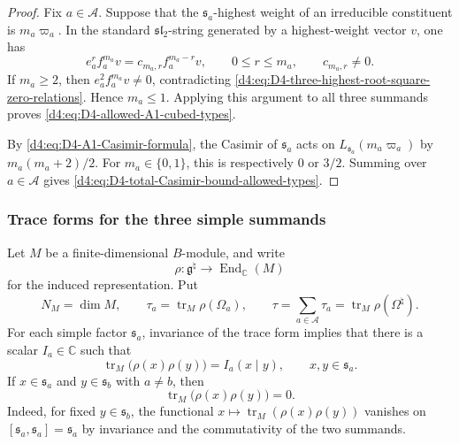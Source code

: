 \documentclass[11pt,reqno]{amsart}
\theoremstyle{definition}
\theoremstyle{remark}
\begin{document}
\begin{proof}
Fix \(a\in\mathcal A\).  Suppose that the \(\mathfrak s_a\)-highest
weight of an irreducible constituent is \(m_a\varpi_a\).  In the
standard \(\mathfrak{sl}_2\)-string generated by a highest-weight vector
\(v\), one has
\begin{equation*}
  e_a^r f_a^{m_a}v
  =c_{m_a,r}f_a^{m_a-r}v,
  \qquad
  0\le r\le m_a,
  \qquad
  c_{m_a,r}\ne0.
\end{equation*}
If \(m_a\ge2\), then \(e_a^2f_a^{m_a}v\ne0\), contradicting
\eqref{d4:eq:D4-three-highest-root-square-zero-relations}.  Hence
\(m_a\le1\).  Applying this argument to all three summands proves
\eqref{d4:eq:D4-allowed-A1-cubed-types}.

By \eqref{d4:eq:D4-A1-Casimir-formula}, the Casimir of \(\mathfrak s_a\)
acts on \(L_{\mathfrak s_a}(m_a\varpi_a)\) by
\(m_a(m_a+2)/2\).  For \(m_a\in\{0,1\}\), this is respectively
\(0\) or \(3/2\).  Summing over \(a\in\mathcal A\) gives
\eqref{d4:eq:D4-total-Casimir-bound-allowed-types}.
\end{proof}

\subsubsection{Trace forms for the three simple summands}


Let \(M\) be a finite-dimensional \(B\)-module, and write
\begin{equation*}
  \rho:\mathfrak g^\natural\longrightarrow
  \operatorname{End}_{\mathbb C}(M)
\end{equation*}
for the induced representation.  Put
\begin{equation*}
  N_M=\dim M,
  \qquad
  \tau_a=\operatorname{tr}_M\rho(\Omega_a),
  \qquad
  \tau=\sum_{a\in\mathcal A}\tau_a
       =\operatorname{tr}_M\rho(\Omega^\natural).
\end{equation*}
For each simple factor \(\mathfrak s_a\), invariance of the trace form
implies that there is a scalar \(I_a\in\mathbb C\) such that
\begin{equation}
  \operatorname{tr}_M\bigl(\rho(x)\rho(y)\bigr)
  =I_a(x\mid y),
  \qquad x,y\in\mathfrak s_a.
  \label{d4:eq:D4-Dynkin-index-each-A1}
\end{equation}
If \(x\in\mathfrak s_a\) and \(y\in\mathfrak s_b\) with \(a\ne b\),
then
\begin{equation}
  \operatorname{tr}_M\bigl(\rho(x)\rho(y)\bigr)=0.
  \label{d4:eq:D4-mixed-trace-forms-zero}
\end{equation}
Indeed, for fixed \(y\in\mathfrak s_b\), the functional
\(x\mapsto\operatorname{tr}_M(\rho(x)\rho(y))\) vanishes on
\([\mathfrak s_a,\mathfrak s_a]=\mathfrak s_a\) by invariance and the
commutativity of the two summands.
\end{document}
